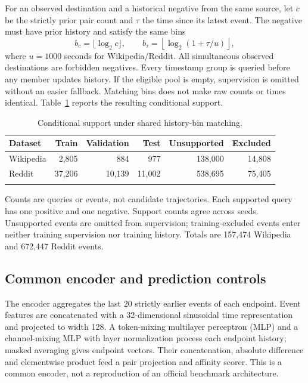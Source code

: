 \documentclass[pdflatex,sn-vancouver-num]{sn-jnl}
\theoremstyle{thmstyleone}
\begin{document}
For an observed destination and a historical negative from the same source, let $c$ be the strictly prior pair count and $\tau$ the time since its latest event. The negative must have prior history and satisfy the same bins
\begin{equation}\label{eq:matching}
b_c=\lfloor\log_2 c\rfloor,\qquad
b_\tau=\left\lfloor\log_2(1+\tau/u)\right\rfloor,
\end{equation}
where $u=1000$ seconds for Wikipedia/Reddit. All simultaneous observed destinations are forbidden negatives. Every timestamp group is queried before any member updates history. If the eligible pool is empty, supervision is omitted without an easier fallback. Matching bins does not make raw counts or times identical. Table~\ref{tab:coverage} reports the resulting conditional support.

\begin{table}[t]
\caption{Conditional support under shared history-bin matching.}\label{tab:coverage}
\centering
\begin{tabular}{@{}lrrrrr@{}}
\toprule
Dataset & Train & Validation & Test & Unsupported & Excluded \\
\midrule
Wikipedia & 2,805 & 884 & 977 & 138,000 & 14,808 \\
Reddit & 37,206 & 10,139 & 11,002 & 538,695 & 75,405 \\
\botrule
\end{tabular}
\begin{tablenotes}[flushleft]\footnotesize\item Counts are queries or events, not candidate trajectories. Each supported query has one positive and one negative. Support counts agree across seeds. Unsupported events are omitted from supervision; training-excluded events enter neither training supervision nor training history. Totals are 157,474 Wikipedia and 672,447 Reddit events.\end{tablenotes}
\end{table}

\subsection{Common encoder and prediction controls}
The encoder aggregates the last 20 strictly earlier events of each endpoint. Event features are concatenated with a 32-dimensional sinusoidal time representation and projected to width 128. A token-mixing multilayer perceptron (MLP) and a channel-mixing MLP with layer normalization process each endpoint history; masked averaging gives endpoint vectors. Their concatenation, absolute difference and elementwise product feed a pair projection and affinity scorer. This is a common encoder, not a reproduction of an official benchmark architecture.
\end{document}
